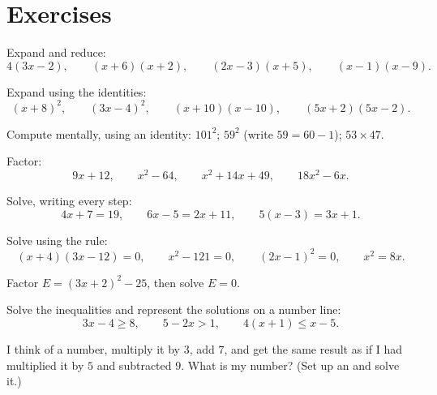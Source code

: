 \section{Exercises}

\begin{exercise}[$\star$]\label{exo:g9:algebra:1}
Expand and reduce:
\[
4(3x - 2), \qquad
(x + 6)(x + 2), \qquad
(2x - 3)(x + 5), \qquad
(x - 1)(x - 9).
\]
\end{exercise}

\begin{exercise}[$\star$]\label{exo:g9:algebra:2}
Expand using the identities:
\[
(x + 8)^2, \qquad
(3x - 4)^2, \qquad
(x + 10)(x - 10), \qquad
(5x + 2)(5x - 2).
\]
\end{exercise}

\begin{exercise}[$\star$]\label{exo:g9:algebra:3}
Compute mentally, using an identity: $101^2$; \quad $59^2$
(write $59 = 60 - 1$); \quad $53 \times 47$.
\end{exercise}

\begin{exercise}[$\star$]\label{exo:g9:algebra:4}
Factor:
\[
9x + 12, \qquad
x^2 - 64, \qquad
x^2 + 14x + 49, \qquad
18x^2 - 6x .
\]
\end{exercise}

\begin{exercise}[$\star$]\label{exo:g9:algebra:5}
Solve, writing every step:
\[
4x + 7 = 19, \qquad
6x - 5 = 2x + 11, \qquad
5(x - 3) = 3x + 1 .
\]
\end{exercise}

\begin{exercise}[$\star\star$]\label{exo:g9:algebra:6}
Solve using the  rule:
\[
(x + 4)(3x - 12) = 0, \qquad
x^2 - 121 = 0, \qquad
(2x - 1)^2 = 0, \qquad
x^2 = 8x .
\]
\end{exercise}

\begin{exercise}[$\star\star$]\label{exo:g9:algebra:7}
Factor $E = (3x + 2)^2 - 25$, then solve $E = 0$.
\end{exercise}

\begin{exercise}[$\star\star$]\label{exo:g9:algebra:8}
Solve the inequalities and represent the solutions on a number line:
\[
3x - 4 \geq 8, \qquad
5 - 2x > 1, \qquad
4(x + 1) \leq x - 5 .
\]
\end{exercise}

\begin{exercise}[$\star\star$]\label{exo:g9:algebra:9}
I think of a number, multiply it by $3$, add $7$, and get the same result
as if I had multiplied it by $5$ and subtracted $9$. What is my number?
(Set up an  and solve it.)
\end{exercise}

